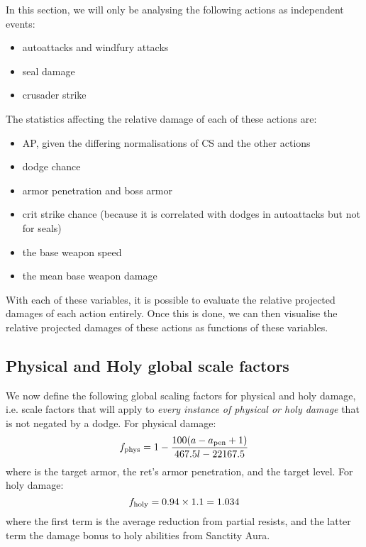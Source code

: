 In this section, we will only be analysing the following actions as independent events:
\begin{itemize}
	\item autoattacks and windfury attacks
	\item seal damage
	\item crusader strike
\end{itemize}
The statistics affecting the relative damage of each of these actions are:
\begin{itemize}
	\item AP, given the differing normalisations of CS and the other actions
	\item dodge chance
	\item armor penetration and boss armor
	\item crit strike chance (because it is correlated with dodges in autoattacks but not for seals)
	\item the base weapon speed
	\item the mean base weapon damage
\end{itemize}
With each of these variables, it is possible to evaluate the relative projected damages of each action entirely.
Once this is done, we can then visualise the relative projected damages of these actions as functions of these variables.

\subsection{Physical and Holy global scale factors}

We now define the following global scaling factors for physical and holy damage, i.e. scale factors that will apply to \emph{every instance of physical or holy damage} that is not negated by a dodge.
For physical damage:
\begin{equation}
	f_{\mathrm{phys}}  = 1 - \frac{100(a - a_\mathrm{pen} + 1)}{467.5 l -22167.5}
\end{equation}
where \armor is the target armor, \armpen the ret's armor penetration, and \lvl the target level.
\noindent
For holy damage:
\begin{equation}
	f_{\mathrm{holy}}  = 0.94 \times 1.1 = 1.034
\end{equation}
where the first term is the average reduction from partial resists, and the latter term the damage bonus to holy abilities from Sanctity Aura.

